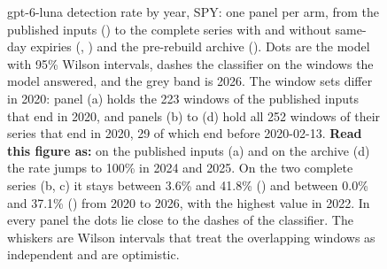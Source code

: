 \begin{figure}[!htbp]
\centering
\resultfigure{\figComplete}
\caption{gpt-6-luna detection rate by year, SPY: one panel per arm, from the published inputs () to the complete series with and without same-day expiries (, ) and the pre-rebuild archive (). Dots are the model with 95\% Wilson intervals, dashes the classifier on the windows the model answered, and the grey band is 2026. The window sets differ in 2020: panel (a) holds the 223 windows of the published inputs that end in 2020, and panels (b) to (d) hold all 252 windows of their series that end in 2020, 29 of which end before 2020-02-13. \textbf{Read this figure as:} on the published inputs (a) and on the archive (d) the rate jumps to 100\% in 2024 and 2025. On the two complete series (b, c) it stays between 3.6\% and 41.8\% () and between 0.0\% and 37.1\% () from 2020 to 2026, with the highest value in 2022. In every panel the dots lie close to the dashes of the classifier. The whiskers are Wilson intervals that treat the overlapping windows as independent and are optimistic.}
\label{fig:complete}
\end{figure}
